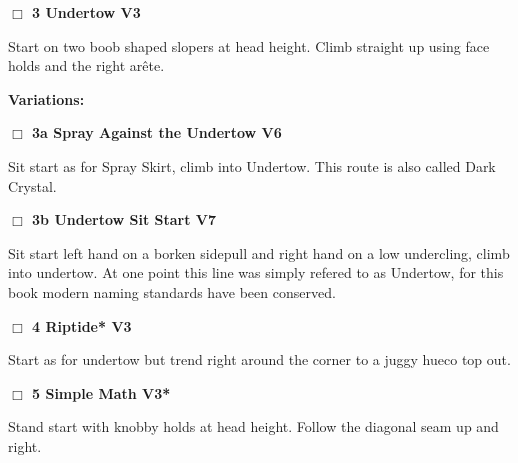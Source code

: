 \begin{multicols}{2}
\needspace{1.5cm}
\label{rt:Undertow}
\colorbox{green!20}{
\parbox{0.95\linewidth}{
\hspace{-1ex}\textbf{$\Box$
3 Undertow V3  
}}}
\begin{adjustwidth}{1.3em}{}			
Start on two boob shaped slopers at head height. Climb straight up using face holds and the right arête.
\end{adjustwidth}


\begin{adjustwidth}{0.5cm}{}				
\needspace{3cm}
\textbf{Variations:} \newline

\needspace{1.5cm}
\label{vr:Spray Against the Undertow}
\colorbox{RoyalBlue!20}{
\parbox{0.95\linewidth}{
\hspace{-1ex}\textbf{$\Box$
3a Spray Against the Undertow V6  
}}}
\begin{adjustwidth}{1.3em}{}			
Sit start as for Spray Skirt, climb into Undertow. This route is also called Dark Crystal.
\end{adjustwidth}




\needspace{1.5cm}
\label{vr:Undertow Sit Start}
\colorbox{Goldenrod!20}{
\parbox{0.95\linewidth}{
\hspace{-1ex}\textbf{$\Box$
3b Undertow Sit Start V7  
}}}
\begin{adjustwidth}{1.3em}{}			
Sit start left hand on a borken sidepull and right hand on a low undercling, climb into undertow. At one point this line was simply refered to as Undertow, for this book modern naming standards have been conserved.
\end{adjustwidth}



\end{adjustwidth}


\needspace{1.5cm}
\label{rt:Riptide}
\colorbox{green!20}{
\parbox{0.95\linewidth}{
\hspace{-1ex}\textbf{$\Box$
4 Riptide* V3  
}}}
\begin{adjustwidth}{1.3em}{}			
Start as for undertow but trend right around the corner to a juggy hueco top out.
\end{adjustwidth}




\needspace{1.5cm}
\label{rt:Simple Math}
\colorbox{green!20}{
\parbox{0.95\linewidth}{
\hspace{-1ex}\textbf{$\Box$
5 Simple Math V3*  
}}}
\begin{adjustwidth}{1.3em}{}			
Stand start with knobby holds at head height. Follow the diagonal seam up and right.
\end{adjustwidth}



\end{multicols}
